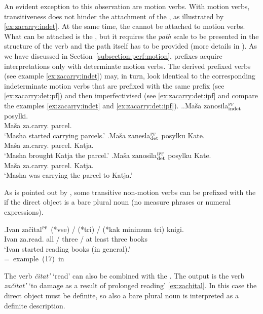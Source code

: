 An evident exception to this observation are motion verbs. With motion verbs, transitiveness does not hinder the attachment of the  , as illustrated by \ref{ex:zacarry:indet}. At the same time, the   cannot be attached to motion verbs. What can be attached is the  , but it requires the \textit{path} scale to be presented in the structure of the verb and the path itself has to be provided (more details in \citealt{ZinovaOsswald:paper}). As we have discussed in Section~\ref{subsection:perf:motion}, prefixes acquire  interpretations only with determinate motion verbs. The derived prefixed verbs (see example \ref{ex:zacarry:indet}) may, in turn, look identical to the corresponding indeterminate motion verbs that are prefixed with the same prefix (see \ref{ex:zacarry:det:pf}) and then imperfectivised (see \ref{ex:zacarry:det:ipf} and compare the examples \ref{ex:zacarry:indet} and \ref{ex:zacarry:det:ipf}).
 \ex.\label{ex:zacarry}\ag.\label{ex:zacarry:indet}Ma\v{s}a zanosila$^{\textsc{pf}}_{\text{\normalfont indet}}$ posylki.\\
 Ma\v{s}a za.carry. parcel.\\
 \trans `Masha started carrying parcels.'
\bg.\label{ex:zacarry:det:pf}Ma\v{s}a zanesla$^{\textsc{pf}}_{\text{\normalfont det}}$ posylku Kate.\\
 Ma\v{s}a za.carry. parcel. Katja.\\
 \trans `Masha brought Katja the parcel.'
\bg.\label{ex:zacarry:det:ipf}Ma\v{s}a zanosila$^{\textsc{ipf}}_{\text{\normalfont det}}$ posylku Kate.\\
 Ma\v{s}a za.carry. parcel. Katja.\\
 \trans `Masha was carrying the parcel to Katja.'
 
As is pointed out by \citet[227]{Braginsky:08}, some transitive non-motion verbs can be prefixed with the   if the direct object is a bare plural noun (no measure phrases or numeral expressions).

\exg.Ivan za\v{c}ital$^{\textsc{pf}}$ (*vse) / (*tri) / (*kak minimum tri) knigi.\\
Ivan za.read. all / three / at least three books\\
\trans `Ivan started reading books (in general).'\\\hbox{}\hfill\hbox{= example (17) in \citealt[227]{Braginsky:08}}

The verb \textit{\v{c}itat'} `read' can also be combined with the  . The output is the verb \textit{za\v{c}itat'} `to damage as a result of prolonged reading' \ref{ex:zachital}. In this case the direct object must be definite, so also a bare plural noun is interpreted as a definite description.

